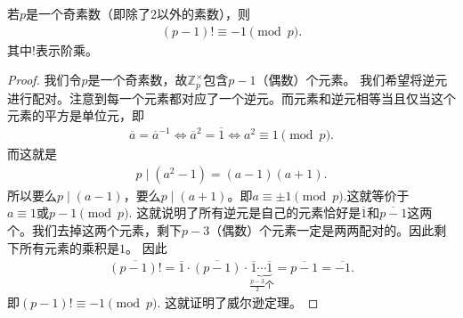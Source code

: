 \documentclass[../../main.tex]{subfiles}
\begin{document}
\begin{theorem}[Wilson定理]\label{theorem:Wilson}
若$p$是一个奇素数（即除了$2$以外的素数），则
\begin{align*}
(p - 1)! \equiv -1 \pmod{p} .
\end{align*}
其中$!$表示阶乘。
\end{theorem}
\begin{proof}
我们令$p$是一个奇素数，故$\mathbb{Z}_p^\times$包含$p - 1$（偶数）个元素。
我们希望将逆元进行配对。注意到每一个元素都对应了一个逆元。而元素和逆元相等当且仅当这个元素的平方是单位元，即
\begin{align*}
\overline{a} = \overline{a}^{-1} \iff \overline{a}^2=\overline{1} \iff a^2 \equiv 1 \pmod{p} .
\end{align*}
而这就是
\begin{align*}
p \mid (a^2 - 1) = (a - 1)(a + 1) .
\end{align*}
所以要么$p \mid (a - 1)$，要么$p \mid (a + 1)$。即$a \equiv \pm 1 \pmod{p}$.这就等价于$a \equiv 1\text{或}p-1 \pmod{p} .$
这就说明了所有逆元是自己的元素恰好是$\overline{1}$和$\overline{p-1}$这两个。我们去掉这两个元素，剩下$p - 3$（偶数）个元素一定是两两配对的。因此剩下所有元素的乘积是$1$。
因此
\begin{align*}
\overline{(p-1)!}=\overline{1}\cdot \overline{(p-1)}\cdot \underset{\frac{p-3}{2}\text{个}}{\underbrace{\overline{1}\cdots \overline{1}}}=\overline{p-1}=\overline{-1}.
\end{align*}
即$(p-1)!\equiv -1 \pmod{p}.$
这就证明了威尔逊定理。 

\end{proof}
\end{document}
